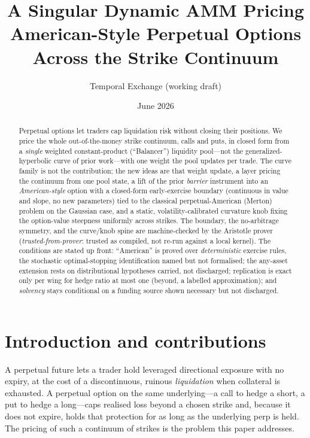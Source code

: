 \documentclass[11pt]{article}
\title{A Singular Dynamic AMM Pricing American-Style Perpetual Options\\
Across the Strike Continuum}
\author{Temporal Exchange (working draft)}
\date{June 2026}
\newcommand{\tfp}{\emph{trusted-from-prover}}
\begin{document}
\maketitle

\begin{abstract}
Perpetual options let traders cap liquidation risk without closing their
positions. We price the whole out-of-the-money strike continuum, calls and puts,
in closed form from a \emph{single} weighted constant-product (``Balancer'')
liquidity pool---not the generalized-hyperbolic curve of prior work---with one
weight the pool updates per trade. The curve family is not the contribution; the
new ideas are that weight update, a layer pricing the continuum from one pool
state, a lift of the prior \emph{barrier} instrument into an
\emph{American-style} option with a closed-form early-exercise boundary
(continuous in value and slope, no new parameters) tied to the classical
perpetual-American (Merton) problem on the Gaussian case, and a static,
volatility-calibrated curvature knob fixing the option-value steepness uniformly
across strikes. The boundary, the no-arbitrage symmetry, and the curve/knob spine
are machine-checked by the Aristotle prover (\tfp{}: trusted as compiled, not
re-run against a local kernel). The conditions are stated up front:
``American'' is proved over \emph{deterministic} exercise rules, the stochastic
optimal-stopping identification named but not formalised; the any-asset extension
rests on distributional hypotheses carried, not discharged; replication is
exact only per wing for hedge ratio at most one (beyond, a labelled
approximation); and \emph{solvency} stays conditional on a funding source shown
necessary but not discharged.
\end{abstract}

\tableofcontents

\section{Introduction and contributions}

A perpetual future lets a trader hold leveraged directional exposure with no
expiry, at the cost of a discontinuous, ruinous \emph{liquidation} when
collateral is exhausted. A perpetual option on the same underlying---a call to
hedge a short, a put to hedge a long---caps realised loss beyond a chosen strike
and, because it does not expire, holds that protection for as long as the
underlying perp is held. The pricing of such a continuum of strikes is the
problem this paper addresses.
\end{document}
